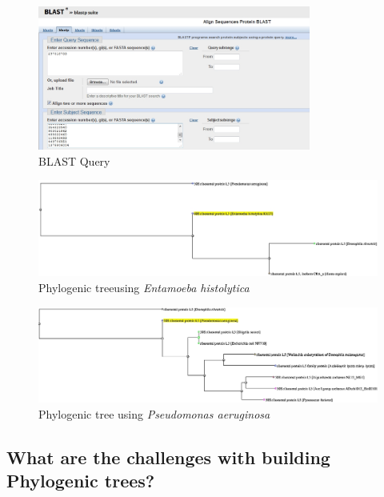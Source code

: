 \documentclass[]{article}
\begin{document}
\begin{figure}[H]
	\caption{BLAST Query}\label{fig:BLAST1}
	\includegraphics[width=0.8\textwidth]{BLAST1}
\end{figure}

\begin{figure}[H]
	\caption{Phylogenic treeusing \textit{Entamoeba histolytica }}\label{fig:Phylo3}
	\includegraphics[width=\textwidth]{Phylo3}
\end{figure}

\begin{figure}[H]
	\caption{Phylogenic tree using \textit{Pseudomonas aeruginosa}}\label{fig:Phylo4}
	\includegraphics[width=\textwidth]{Phylo4}
\end{figure}

\subsection{ What are the challenges with building Phylogenic trees?}



\printglossaries




\end{document}
